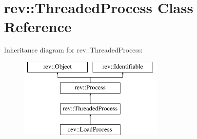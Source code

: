 \hypertarget{classrev_1_1_threaded_process}{}\section{rev\+::Threaded\+Process Class Reference}
\label{classrev_1_1_threaded_process}
Inheritance diagram for rev\+::Threaded\+Process\+:\begin{figure}[H]
\begin{center}
\leavevmode
\includegraphics[height=4.000000cm]{classrev_1_1_threaded_process}
\end{center}
\end{figure}
